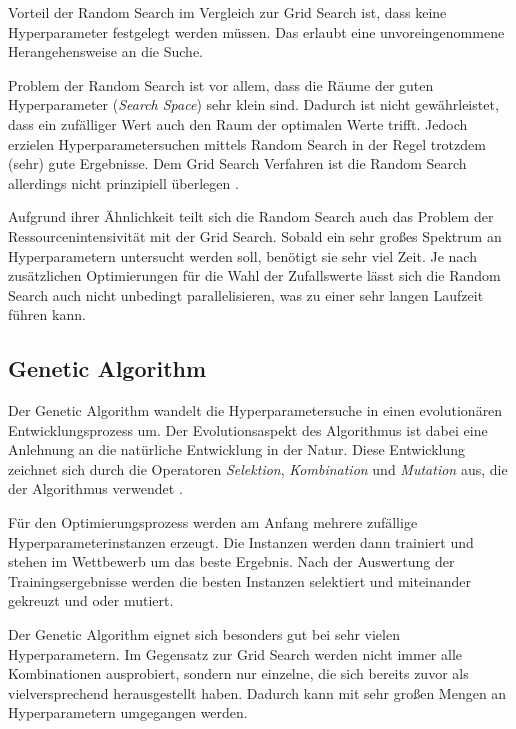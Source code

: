 Vorteil der Random Search im Vergleich zur Grid Search ist, dass keine Hyperparameter festgelegt werden müssen.
Das erlaubt eine unvoreingenommene Herangehensweise an die Suche.
\newline

Problem der Random Search ist vor allem, dass die Räume der guten Hyperparameter (\textit{Search Space}) sehr klein sind.
Dadurch ist nicht gewährleistet, dass ein zufälliger Wert auch den Raum der optimalen Werte trifft.
Jedoch erzielen Hyperparametersuchen mittels Random Search in der Regel trotzdem (sehr) gute Ergebnisse.
Dem Grid Search Verfahren ist die Random Search allerdings nicht prinzipiell überlegen \cite{hyperparameters-random-search}.
\newline

Aufgrund ihrer Ähnlichkeit teilt sich die Random Search auch das Problem der Ressourcenintensivität mit der Grid Search.
Sobald ein sehr großes Spektrum an Hyperparametern untersucht werden soll, benötigt sie sehr viel Zeit.
Je nach zusätzlichen Optimierungen für die Wahl der Zufallswerte lässt sich die Random Search auch nicht unbedingt parallelisieren, was zu einer sehr langen Laufzeit führen kann.

\subsection{Genetic Algorithm}
Der Genetic Algorithm \cite{hyperparameters-genetic-algorithm} wandelt die Hyperparametersuche in einen evolutionären Entwicklungsprozess um.
Der Evolutionsaspekt des Algorithmus ist dabei eine Anlehnung an die natürliche Entwicklung in der Natur.
Diese Entwicklung zeichnet sich durch die Operatoren \textit{Selektion}, \textit{Kombination} und \textit{Mutation} aus, die der Algorithmus verwendet .
\newline

Für den Optimierungsprozess werden am Anfang mehrere zufällige Hyperparameterinstanzen erzeugt.
Die Instanzen werden dann trainiert und stehen im Wettbewerb um das beste Ergebnis.
Nach der Auswertung der Trainingsergebnisse werden die besten Instanzen selektiert und miteinander gekreuzt und oder mutiert.
\newline

Der Genetic Algorithm eignet sich besonders gut bei sehr vielen Hyperparametern.
Im Gegensatz zur Grid Search werden nicht immer alle Kombinationen ausprobiert, sondern nur einzelne, die sich bereits zuvor als vielversprechend herausgestellt haben.
Dadurch kann mit sehr großen Mengen an Hyperparametern umgegangen werden.
\newline

